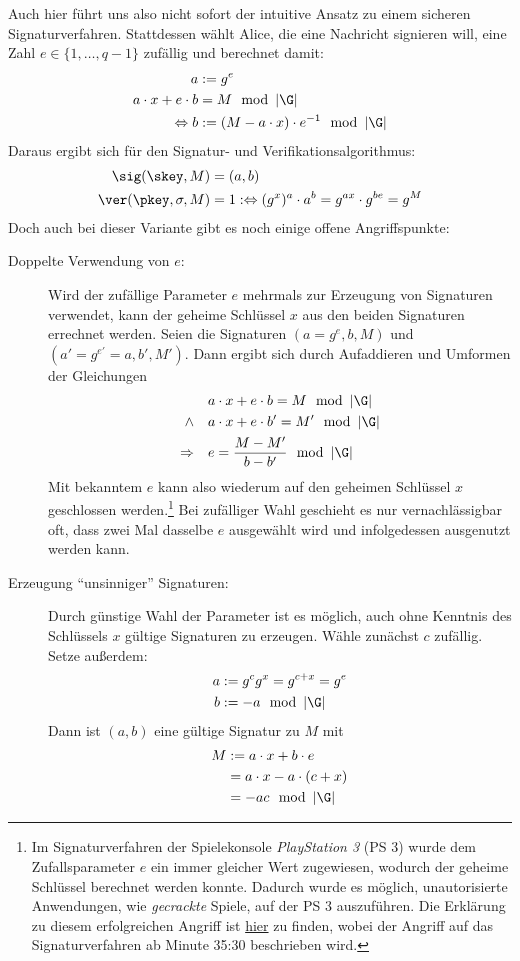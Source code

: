 Auch hier führt uns also nicht sofort der intuitive Ansatz zu einem sicheren Signaturverfahren. Stattdessen wählt Alice, die eine Nachricht signieren will, eine Zahl $e \in \{1, \dots, q - 1\}$ zufällig und berechnet damit:
\begin{align*}
a &:= g^e\\
a \cdot x + e \cdot b &= M \mod \left|\G\right|\\
\Leftrightarrow b &:= (M - a \cdot x) \cdot e^{-1} \mod \left|\G\right|
\end{align*}
Daraus ergibt sich für den Signatur- und Verifikationsalgorithmus:
\begin{align*}
\sig(\skey,M) &= (a, b)\\
\ver(\pkey,\sigma,M) &= 1 :\Leftrightarrow (g^x)^a \cdot a^b = g^{ax} \cdot g^{be} = g^M
\end{align*}
Doch auch bei dieser Variante gibt es noch einige offene Angriffspunkte:
\begin{description}
	\item[Doppelte Verwendung von $e$:]
	Wird der zufällige Parameter $e$ mehrmals zur Erzeugung von Signaturen verwendet, kann der geheime Schlüssel $x$ aus den beiden Signaturen errechnet werden. Seien die Signaturen $(a = g^e, b, M)$ und $(a' = g^{e'} = a, b', M')$. Dann ergibt sich durch Aufaddieren und Umformen
	der Gleichungen
	\begin{align*}
	&a \cdot x + e \cdot b = M \mod \left|\G\right|\\
	\land \quad &a \cdot x + e \cdot b' = M' \mod \left|\G\right|\\
	\Rightarrow \quad &e = \frac{M - M'}{b - b'} \mod \left|\G\right|
	\end{align*}
	Mit bekanntem $e$ kann also wiederum auf den geheimen Schlüssel $x$ geschlossen werden.\footnote{Im Signaturverfahren der Spielekonsole \textit{PlayStation 3} (PS 3) wurde dem Zufallsparameter $e$ ein immer gleicher Wert zugewiesen, wodurch der geheime Schlüssel berechnet werden konnte. Dadurch wurde es möglich, unautorisierte Anwendungen, wie \textit{gecrackte} Spiele, auf der PS 3 auszuführen. Die Erklärung zu diesem erfolgreichen Angriff ist \href{https://www.youtube.com/watch?v=4loZGYqaZ7I}{hier} zu finden, wobei der Angriff auf das Signaturverfahren ab Minute 35:30 beschrieben wird.} Bei zufälliger Wahl geschieht es nur vernachlässigbar oft, dass zwei Mal dasselbe $e$ ausgewählt wird und infolgedessen ausgenutzt werden kann.
	\item[Erzeugung "`unsinniger"' Signaturen:]
	Durch günstige Wahl der Parameter ist es möglich, auch ohne Kenntnis des Schlüssels $x$ gültige Signaturen zu erzeugen. Wähle zunächst $c$
	zufällig. Setze außerdem:
	\begin{align*}
	a &:= g^cg^x = g^{c+x} = g^e\\
	b &:= -a \mod \left|\G\right|
	\end{align*}
	Dann ist $(a, b)$ eine gültige Signatur zu $M$ mit
	\begin{align*}
	M &:= a \cdot x + b \cdot e\\
	&= a \cdot x - a \cdot (c + x)\\
	&= -ac \mod \left|\G\right|
	\end{align*}
\end{description}

